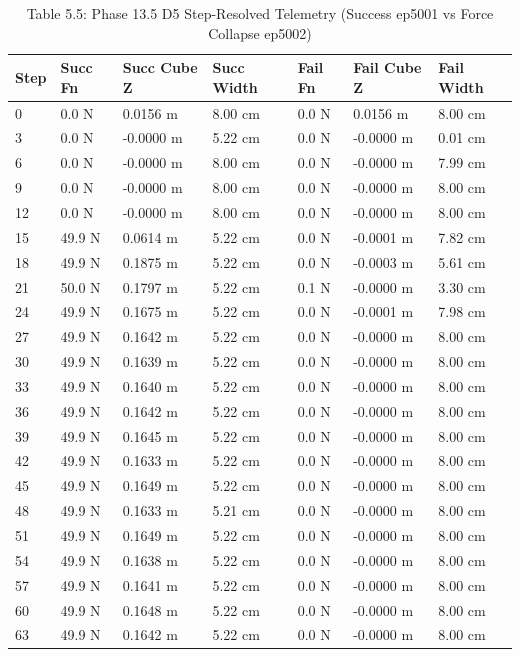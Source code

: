 \documentclass[11pt,a4paper,oneside]{book}
\begin{document}
\begin{longtable}{l l l l l l l}\caption{Table 5.5: Phase 13.5 D5 Step-Resolved Telemetry (Success ep5001 vs Force Collapse ep5002)}\\\toprule
Step & Succ Fn & Succ Cube Z & Succ Width & Fail Fn & Fail Cube Z & Fail Width \\ \midrule \endhead
0 & 0.0 N & 0.0156 m & 8.00 cm & 0.0 N & 0.0156 m & 8.00 cm \\
3 & 0.0 N & -0.0000 m & 5.22 cm & 0.0 N & -0.0000 m & 0.01 cm \\
6 & 0.0 N & -0.0000 m & 8.00 cm & 0.0 N & -0.0000 m & 7.99 cm \\
9 & 0.0 N & -0.0000 m & 8.00 cm & 0.0 N & -0.0000 m & 8.00 cm \\
12 & 0.0 N & -0.0000 m & 8.00 cm & 0.0 N & -0.0000 m & 8.00 cm \\
15 & 49.9 N & 0.0614 m & 5.22 cm & 0.0 N & -0.0001 m & 7.82 cm \\
18 & 49.9 N & 0.1875 m & 5.22 cm & 0.0 N & -0.0003 m & 5.61 cm \\
21 & 50.0 N & 0.1797 m & 5.22 cm & 0.1 N & -0.0000 m & 3.30 cm \\
24 & 49.9 N & 0.1675 m & 5.22 cm & 0.0 N & -0.0001 m & 7.98 cm \\
27 & 49.9 N & 0.1642 m & 5.22 cm & 0.0 N & -0.0000 m & 8.00 cm \\
30 & 49.9 N & 0.1639 m & 5.22 cm & 0.0 N & -0.0000 m & 8.00 cm \\
33 & 49.9 N & 0.1640 m & 5.22 cm & 0.0 N & -0.0000 m & 8.00 cm \\
36 & 49.9 N & 0.1642 m & 5.22 cm & 0.0 N & -0.0000 m & 8.00 cm \\
39 & 49.9 N & 0.1645 m & 5.22 cm & 0.0 N & -0.0000 m & 8.00 cm \\
42 & 49.9 N & 0.1633 m & 5.22 cm & 0.0 N & -0.0000 m & 8.00 cm \\
45 & 49.9 N & 0.1649 m & 5.22 cm & 0.0 N & -0.0000 m & 8.00 cm \\
48 & 49.9 N & 0.1633 m & 5.21 cm & 0.0 N & -0.0000 m & 8.00 cm \\
51 & 49.9 N & 0.1649 m & 5.22 cm & 0.0 N & -0.0000 m & 8.00 cm \\
54 & 49.9 N & 0.1638 m & 5.22 cm & 0.0 N & -0.0000 m & 8.00 cm \\
57 & 49.9 N & 0.1641 m & 5.22 cm & 0.0 N & -0.0000 m & 8.00 cm \\
60 & 49.9 N & 0.1648 m & 5.22 cm & 0.0 N & -0.0000 m & 8.00 cm \\
63 & 49.9 N & 0.1642 m & 5.22 cm & 0.0 N & -0.0000 m & 8.00 cm \\

\end{longtable}
\end{document}
